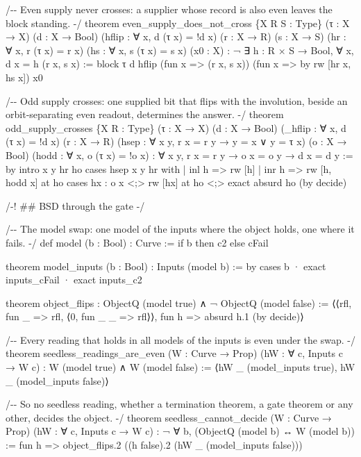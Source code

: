 \documentclass[10pt,twocolumn]{article}
\newenvironment{Shaded}{}{}
\newcommand{\NormalTok}[1]{#1}
\providecommand{\NormalTok}[1]{#1}
\providecommand{\NormalTok}[1]{#1}
\begin{document}
\begin{strip}
\begin{Shaded}
\begin{Highlighting}[]
\NormalTok{/{-}{-} Even supply never crosses: a supplier whose record is also even leaves the block standing. {-}/}
\NormalTok{theorem even\_supply\_does\_not\_cross \{X R S : Type\} (τ : X → X) (d : X → Bool) (hflip : ∀ x, d (τ x) = !d x)}
\NormalTok{    (r : X → R) (s : X → S) (hr : ∀ x, r (τ x) = r x) (hs : ∀ x, s (τ x) = s x) (x0 : X) :}
\NormalTok{    ¬ ∃ h : R × S → Bool, ∀ x, d x = h (r x, s x) :=}
\NormalTok{  block τ d hflip (fun x =\textgreater{} (r x, s x)) (fun x =\textgreater{} by rw [hr x, hs x]) x0}

\NormalTok{/{-}{-} Odd supply crosses: one supplied bit that flips with the involution, beside an orbit{-}separating even readout,}
\NormalTok{    determines the answer. {-}/}
\NormalTok{theorem odd\_supply\_crosses \{X R : Type\} (τ : X → X) (d : X → Bool) (\_hflip : ∀ x, d (τ x) = !d x)}
\NormalTok{    (r : X → R) (hsep : ∀ x y, r x = r y → y = x ∨ y = τ x)}
\NormalTok{    (o : X → Bool) (hodd : ∀ x, o (τ x) = !o x) : ∀ x y, r x = r y → o x = o y → d x = d y := by}
\NormalTok{  intro x y hr ho}
\NormalTok{  cases hsep x y hr with}
\NormalTok{  | inl h =\textgreater{} rw [h]}
\NormalTok{  | inr h =\textgreater{}}
\NormalTok{    rw [h, hodd x] at ho}
\NormalTok{    cases hx : o x \textless{};\textgreater{} rw [hx] at ho \textless{};\textgreater{} exact absurd ho (by decide)}

\NormalTok{/{-}! \#\# BSD through the gate {-}/}

\NormalTok{/{-}{-} The model swap: one model of the inputs where the object holds, one where it fails. {-}/}
\NormalTok{def model (b : Bool) : Curve := if b then c2 else cFail}

\NormalTok{theorem model\_inputs (b : Bool) : Inputs (model b) := by}
\NormalTok{  cases b}
\NormalTok{  · exact inputs\_cFail}
\NormalTok{  · exact inputs\_c2}

\NormalTok{theorem object\_flips : ObjectQ (model true) ∧ ¬ ObjectQ (model false) :=}
\NormalTok{  ⟨⟨rfl, fun \_ =\textgreater{} rfl, ⟨0, fun \_ \_ =\textgreater{} rfl⟩⟩, fun h =\textgreater{} absurd h.1 (by decide)⟩}

\NormalTok{/{-}{-} Every reading that holds in all models of the inputs is even under the swap. {-}/}
\NormalTok{theorem seedless\_readings\_are\_even (W : Curve → Prop) (hW : ∀ c, Inputs c → W c) :}
\NormalTok{    W (model true) ∧ W (model false) :=}
\NormalTok{  ⟨hW \_ (model\_inputs true), hW \_ (model\_inputs false)⟩}

\NormalTok{/{-}{-} So no seedless reading, whether a termination theorem, a gate theorem or any other, decides the object. {-}/}
\NormalTok{theorem seedless\_cannot\_decide (W : Curve → Prop) (hW : ∀ c, Inputs c → W c) :}
\NormalTok{    ¬ ∀ b, (ObjectQ (model b) ↔ W (model b)) :=}
\NormalTok{  fun h =\textgreater{} object\_flips.2 ((h false).2 (hW \_ (model\_inputs false)))}


\end{Highlighting}
\end{Shaded}
\end{strip}
\end{document}
